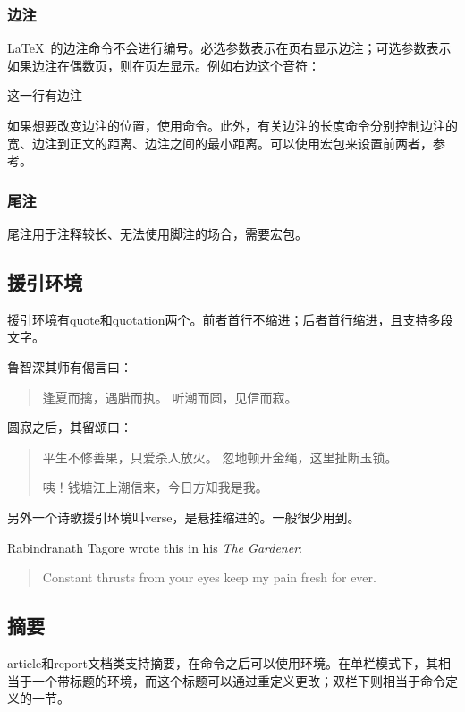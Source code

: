 \subsubsection{边注}
\LaTeX\ 的边注命令不会进行编号。必选参数表示在页右显示边注；可选参数表示如果边注在偶数页，则在页左显示。例如右边这个音符：\marginpar{\twonotes}
\begin{latex}
这一行有边注
\end{latex}

如果想要改变边注的位置，使用命令。此外，有关边注的长度命令分别控制边注的宽、边注到正文的距离、边注之间的最小距离。可以使用宏包来设置前两者，参考。

\subsubsection{尾注}
尾注用于注释较长、无法使用脚注的场合，需要宏包。

\subsection{援引环境}
援引环境有quote和quotation两个。前者首行不缩进；后者首行缩进，且支持多段文字。

\begin{codeshow}
鲁智深其师有偈言曰：
\begin{quote}
逢夏而擒，遇腊而执。
听潮而圆，见信而寂。
\end{quote}
圆寂之后，其留颂曰：
\begin{quotation}
平生不修善果，只爱杀人放火。
忽地顿开金绳，这里扯断玉锁。

咦！钱塘江上潮信来，今日方知我是我。
\end{quotation}
\end{codeshow}

另外一个诗歌援引环境叫verse，\label{envi:verse}是悬挂缩进的。一般很少用到。

\begin{codeshow}
Rabindranath Tagore wrote this in 
his \emph{The Gardener}: 
\begin{verse}
Constant thrusts from your eyes
keep my pain fresh for ever.
\end{verse}
\end{codeshow}

\subsection{摘要}
article和report文档类支持摘要，在命令之后可以使用环境。在单栏模式下，其相当于一个带标题的环境，而这个标题可以通过重定义更改；双栏下则相当于命令定义的一节。

